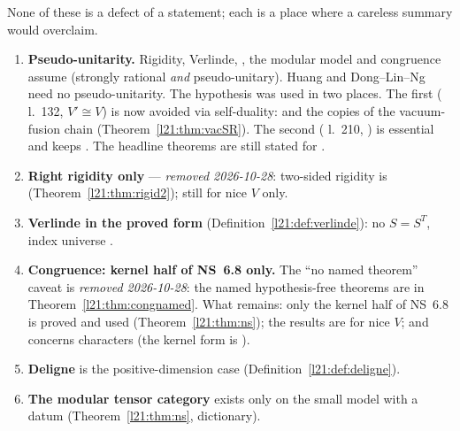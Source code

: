 \begin{warning}[title={Scope restrictions recorded by the release audit (2026-10-27)}]
None of these is a defect of a statement; each is a place where a careless summary would overclaim.
\begin{enumerate}
\item \textbf{Pseudo-unitarity.} Rigidity, Verlinde, , the modular model and congruence assume 
  (strongly rational \emph{and} pseudo-unitary). Huang and Dong--Lin--Ng need no pseudo-unitarity. The hypothesis was
  used in two places. The first ( l.~132, $V'\cong V$) is now avoided via
  self-duality:  and the  copies of the
  vacuum-fusion chain (Theorem~\ref{l21:thm:vacSR}). The second ( l.~210,
  ) is essential and keeps . The headline theorems are still stated for .
\item \textbf{Right rigidity only} --- \emph{removed 2026-10-28}: two-sided rigidity is 
  (Theorem~\ref{l21:thm:rigid2}); still for nice $V$ only.
\item \textbf{Verlinde in the proved form} (Definition~\ref{l21:def:verlinde}): no $S=S^T$, index universe .
\item \textbf{Congruence: kernel half of NS~6.8 only.} The ``no named theorem'' caveat is \emph{removed 2026-10-28}: the named
  hypothesis-free theorems are in Theorem~\ref{l21:thm:congnamed}. What remains: only the kernel half of NS~6.8 is proved and
  used (Theorem~\ref{l21:thm:ns}); the results are for nice $V$; and  concerns characters (the kernel
  form is ).
\item \textbf{Deligne} is the positive-dimension case (Definition~\ref{l21:def:deligne}).
\item \textbf{The modular tensor category} exists only on the small model  with a datum 
  (Theorem~\ref{l21:thm:ns}, dictionary).
\end{enumerate}
\end{warning}

